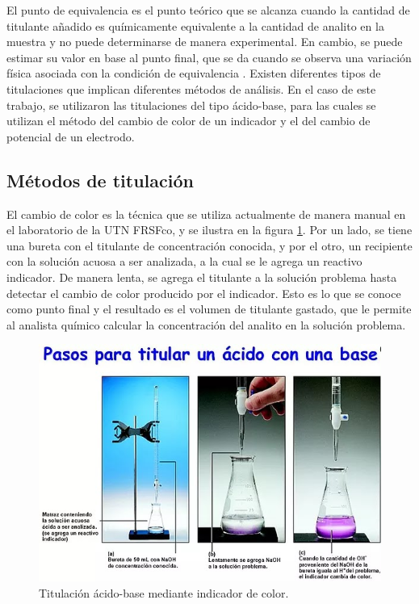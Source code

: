 El punto de equivalencia es el punto teórico que se alcanza cuando la cantidad de titulante añadido es químicamente equivalente a la cantidad de analito
en la muestra y no puede determinarse de manera experimental. En cambio, se puede estimar su valor en base al punto final, que se da cuando se observa una variación física asociada con la condición de equivalencia \citep{BOOK:1}. Existen diferentes tipos de titulaciones que implican diferentes métodos de análisis. En el caso de este trabajo, se utilizaron las titulaciones del tipo ácido-base, para las cuales se utilizan el método del cambio de color de un indicador y el del cambio de potencial de un electrodo.

\subsection{Métodos de titulación}

El cambio de color es la técnica que se utiliza actualmente de manera manual en el laboratorio  de la UTN FRSFco, y se ilustra en la figura \ref{fig:titManualColor}. Por un lado, se tiene una bureta con el titulante de concentración conocida, y por el otro, un recipiente con la solución acuosa a ser analizada, a la cual se le agrega un reactivo indicador. De manera lenta, se agrega el titulante a la solución problema hasta detectar el cambio de color producido por el indicador. Esto es lo que se conoce como punto final y el resultado es el volumen de titulante gastado, que le permite al analista químico calcular la concentración del analito en la solución problema.

\begin{figure}[htbp]
	\centering
	\includegraphics[width=.9\textwidth]{./Figures/titulacionManual.jpg}
	\caption{Titulación ácido-base mediante indicador de color\protect\footnotemark.}
	\label{fig:titManualColor}
\end{figure}

